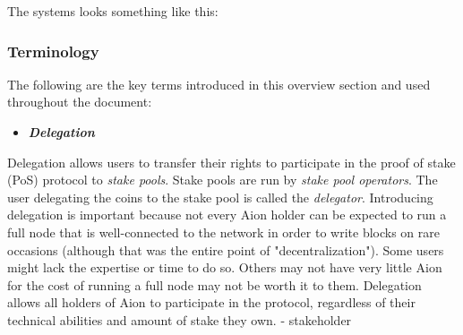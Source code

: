 The systems looks something like this: 






\subsubsection{Terminology}
The following are the key terms introduced in this overview section and used throughout the document:
\begin{itemize}
    \item \textbf{\textit{Delegation}}
\end{itemize}
Delegation allows users to transfer their rights to participate in the proof of stake (PoS) protocol to \textit{stake pools}. Stake pools are run by \textit{stake pool operators}. The user delegating the coins to the stake pool is called the \textit{delegator}. Introducing delegation is important because not every Aion holder can be expected to run a full node that is well-connected to the network in order to write blocks on rare occasions (although that was the entire point of "decentralization"). Some users might lack the expertise or time to do so. Others may not have very little Aion for the cost of running a full node may not be worth it to them. Delegation allows all holders of Aion to participate in the protocol, regardless of their technical abilities and amount of stake they own. 
- stakeholder 


